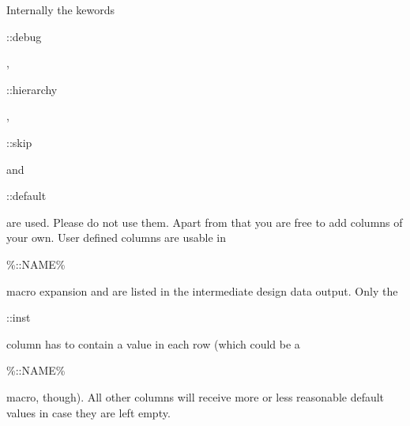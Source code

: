 \documentclass[a4paper,12pt]{article}
\begin{document}
Internally the kewords \begin{tt}::debug\end{tt}, \begin{tt}::hierarchy\end{tt}, \begin{tt}::skip\end{tt} and \begin{tt}::default\end{tt} are used. Please do not use them. Apart from that you are free to add columns of your own. User defined columns are usable in \begin{tt}\%::NAME\%\end{tt} macro expansion and are listed in the intermediate design data output.\newline
Only the \begin{tt}::inst\end{tt} column has to contain a value in each row (which could be a \begin{tt}\%::NAME\%\end{tt} macro, though). All other columns will receive more or less reasonable default values in case they are left empty.
\end{document}
